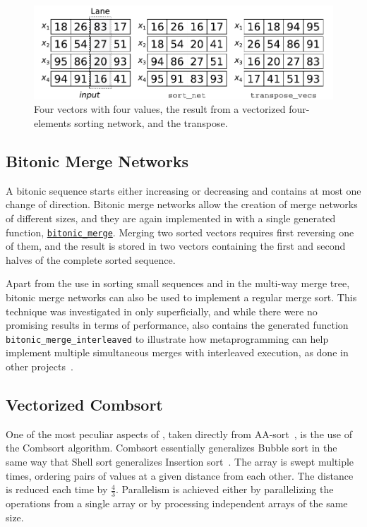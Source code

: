 \documentclass{juliacon}
\begin{document}
\begin{figure}[htb]
\centerline{\includegraphics[width=0.99\linewidth]{fig/regs.pdf}}
\caption{Four vectors with four values, the result from a vectorized four-elements sorting network, and the transpose.}
\label{fig:transpose-vecs}
\end{figure}

\subsection{Bitonic Merge Networks}
%
A bitonic sequence starts either increasing or decreasing and contains at most one change of direction. Bitonic merge networks allow the creation of merge networks of different sizes, and they are again implemented in \chipsort with a single generated function, \href{https://github.com/nlw0/ChipSort.jl/blob/10eb1a962e720aee2bf8733c832468b51a782c1a/src/bitonic-merge-network.jl#L12}{\tt bitonic\_merge}. Merging two sorted vectors requires first reversing one of them, and the result is stored in two vectors containing the first and second halves of the complete sorted sequence.

Apart from the use in sorting small sequences and in the multi-way merge tree, bitonic merge networks can also be used to implement a regular merge sort. This technique was investigated in \chipsort only superficially, and while there were no promising results in terms of performance, \chipsort also contains the generated function {\tt bitonic\_merge\_interleaved} to illustrate how metaprogramming can help implement multiple simultaneous merges with interleaved execution, as done in other projects~\cite{DBLP:journals/pvldb/ChhuganiNLMHCBKD08}.

\subsection{Vectorized Combsort}
%
One of the most peculiar aspects of \chipsort, taken directly from AA-sort~\cite{DBLP:conf/IEEEpact/InoueMKN07,DBLP:journals/pvldb/InoueT15}, is the use of the Combsort algorithm. Combsort essentially generalizes Bubble sort in the same way that Shell sort generalizes Insertion sort~\cite{INCERPI198737,dobosiewicz1980efficient,Lacey:1991:FES:117187.117218,DBLP:books/lib/Knuth98a,DBLP:books/daglib/0023376}. The array is swept multiple times, ordering pairs of values at a given distance from each other. The distance is reduced each time by $\frac{4}{3}$. Parallelism is achieved either by parallelizing the operations from a single array or by processing independent arrays of the same size.
\end{document}
